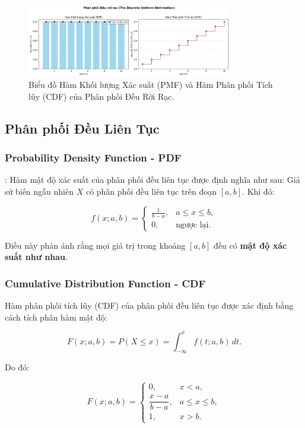 \documentclass[a4paper,12pt]{article}
\begin{document}
\begin{figure}[h!]
    \centering
    \includegraphics[width=0.8\textwidth]{images/Uniform_PMF_and_CDF.png}
    \caption{Biểu đồ Hàm Khối lượng Xác suất (PMF) và Hàm Phân phối Tích lũy (CDF) của Phân phối Đều Rời Rạc.}
    \label{fig:uniform_disc_dist}
\end{figure}

\subsection{Phân phối Đều Liên Tục}
\subsubsection{Probability Density Function - PDF}:
Hàm mật độ xác suất của phân phối đều liên tục được định nghĩa như sau:  
Giả sử biến ngẫu nhiên \( X \) có phân phối đều liên tục trên đoạn \([a, b]\). Khi đó:

\[
f(x; a, b) =
\begin{cases}
\displaystyle \frac{1}{b - a}, & a \le x \le b, \\[1em]
0, & \text{ngược lại}.
\end{cases}
\]

Điều này phản ánh rằng mọi giá trị trong khoảng \([a, b]\) đều có \textbf{mật độ xác suất như nhau}.


\subsubsection{Cumulative Distribution Function - CDF}

Hàm phân phối tích lũy (CDF) của phân phối đều liên tục được xác định bằng cách tích phân hàm mật độ:

\[
F(x; a, b) = P(X \le x) = \int_{-\infty}^x f(t; a, b)\, dt.
\]

Do đó:

\[
F(x; a, b) =
\begin{cases}
0, & x < a, \\[0.8em]
\dfrac{x - a}{b - a}, & a \le x \le b, \\[1em]
1, & x > b.
\end{cases}
\]
\end{document}
